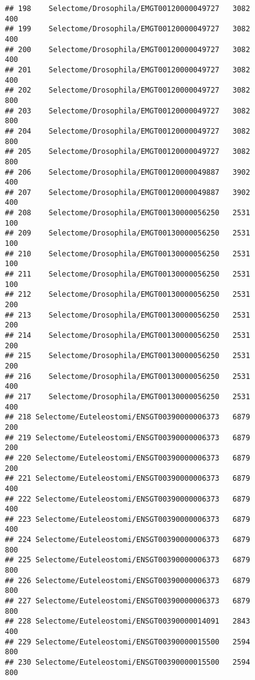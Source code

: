 \documentclass[
]{article}
\begin{document}
\begin{verbatim}
## 198    Selectome/Drosophila/EMGT00120000049727   3082                   400
## 199    Selectome/Drosophila/EMGT00120000049727   3082                   400
## 200    Selectome/Drosophila/EMGT00120000049727   3082                   400
## 201    Selectome/Drosophila/EMGT00120000049727   3082                   400
## 202    Selectome/Drosophila/EMGT00120000049727   3082                   800
## 203    Selectome/Drosophila/EMGT00120000049727   3082                   800
## 204    Selectome/Drosophila/EMGT00120000049727   3082                   800
## 205    Selectome/Drosophila/EMGT00120000049727   3082                   800
## 206    Selectome/Drosophila/EMGT00120000049887   3902                   400
## 207    Selectome/Drosophila/EMGT00120000049887   3902                   400
## 208    Selectome/Drosophila/EMGT00130000056250   2531                   100
## 209    Selectome/Drosophila/EMGT00130000056250   2531                   100
## 210    Selectome/Drosophila/EMGT00130000056250   2531                   100
## 211    Selectome/Drosophila/EMGT00130000056250   2531                   100
## 212    Selectome/Drosophila/EMGT00130000056250   2531                   200
## 213    Selectome/Drosophila/EMGT00130000056250   2531                   200
## 214    Selectome/Drosophila/EMGT00130000056250   2531                   200
## 215    Selectome/Drosophila/EMGT00130000056250   2531                   200
## 216    Selectome/Drosophila/EMGT00130000056250   2531                   400
## 217    Selectome/Drosophila/EMGT00130000056250   2531                   400
## 218 Selectome/Euteleostomi/ENSGT00390000006373   6879                   200
## 219 Selectome/Euteleostomi/ENSGT00390000006373   6879                   200
## 220 Selectome/Euteleostomi/ENSGT00390000006373   6879                   200
## 221 Selectome/Euteleostomi/ENSGT00390000006373   6879                   400
## 222 Selectome/Euteleostomi/ENSGT00390000006373   6879                   400
## 223 Selectome/Euteleostomi/ENSGT00390000006373   6879                   400
## 224 Selectome/Euteleostomi/ENSGT00390000006373   6879                   800
## 225 Selectome/Euteleostomi/ENSGT00390000006373   6879                   800
## 226 Selectome/Euteleostomi/ENSGT00390000006373   6879                   800
## 227 Selectome/Euteleostomi/ENSGT00390000006373   6879                   800
## 228 Selectome/Euteleostomi/ENSGT00390000014091   2843                   400
## 229 Selectome/Euteleostomi/ENSGT00390000015500   2594                   800
## 230 Selectome/Euteleostomi/ENSGT00390000015500   2594                   800

\end{verbatim}
\end{document}
